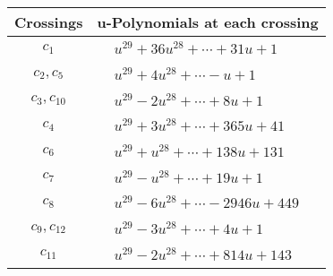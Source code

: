 \documentclass[1p]{elsarticle_modified}
\theoremstyle{definition}
\begin{document}
\begin{tabular}{m{50pt}|m{274pt}}
Crossings & \hspace{64pt}u-Polynomials at each crossing \\
\hline $$\begin{aligned}c_{1}\end{aligned}$$&$\begin{aligned}
&u^{29}+36 u^{28}+\cdots+31 u+1
\end{aligned}$\\
\hline $$\begin{aligned}c_{2},c_{5}\end{aligned}$$&$\begin{aligned}
&u^{29}+4 u^{28}+\cdots- u+1
\end{aligned}$\\
\hline $$\begin{aligned}c_{3},c_{10}\end{aligned}$$&$\begin{aligned}
&u^{29}-2 u^{28}+\cdots+8 u+1
\end{aligned}$\\
\hline $$\begin{aligned}c_{4}\end{aligned}$$&$\begin{aligned}
&u^{29}+3 u^{28}+\cdots+365 u+41
\end{aligned}$\\
\hline $$\begin{aligned}c_{6}\end{aligned}$$&$\begin{aligned}
&u^{29}+u^{28}+\cdots+138 u+131
\end{aligned}$\\
\hline $$\begin{aligned}c_{7}\end{aligned}$$&$\begin{aligned}
&u^{29}- u^{28}+\cdots+19 u+1
\end{aligned}$\\
\hline $$\begin{aligned}c_{8}\end{aligned}$$&$\begin{aligned}
&u^{29}-6 u^{28}+\cdots-2946 u+449
\end{aligned}$\\
\hline $$\begin{aligned}c_{9},c_{12}\end{aligned}$$&$\begin{aligned}
&u^{29}-3 u^{28}+\cdots+4 u+1
\end{aligned}$\\
\hline $$\begin{aligned}c_{11}\end{aligned}$$&$\begin{aligned}
&u^{29}-2 u^{28}+\cdots+814 u+143
\end{aligned}$\\
\hline
\end{tabular}\\~\\
\end{document}

